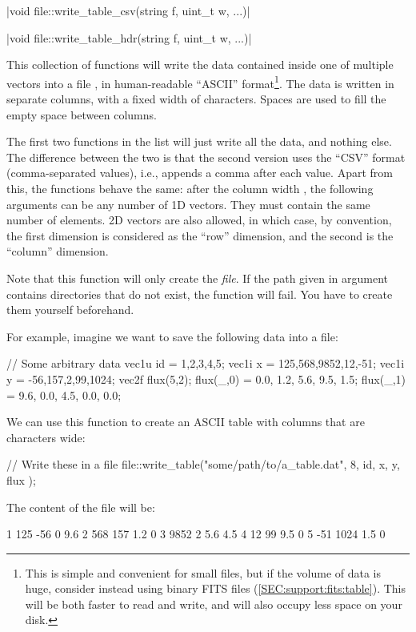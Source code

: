 \documentclass[12pt]{report}
\begin{document}
\begin{itemize}
\cppinline|void file::write_table_csv(string f, uint_t w, ...)| 

\cppinline|void file::write_table_hdr(string f, uint_t w, ...)| 

This collection of functions will write the data contained inside one of multiple vectors into a file , in human-readable ``ASCII'' format\footnote{This is simple and convenient for small files, but if the volume of data is huge, consider instead using binary FITS files (\ref{SEC:support:fits:table}). This will be both faster to read and write, and will also occupy less space on your disk.}. The data is written in separate columns, with a fixed width of  characters. Spaces are used to fill the empty space between columns.

The first two functions in the list will just write all the data, and nothing else. The difference between the two is that the second version uses the ``CSV'' format (comma-separated values), i.e., appends a comma after each value. Apart from this, the functions behave the same: after the column width , the following arguments can be any number of 1D vectors. They must contain the same number of elements. 2D vectors are also allowed, in which case, by convention, the first dimension is considered as the ``row'' dimension, and the second is the ``column'' dimension.

Note that this function will only create the \emph{file}. If the path  given in argument contains directories that do not exist, the function will fail. You have to create them yourself beforehand.

For example, imagine we want to save the following data into a file:
\begin{cppcode}
// Some arbitrary data
vec1u id = {1,2,3,4,5};
vec1i x = {125,568,9852,12,-51};
vec1i y = {-56,157,2,99,1024};
vec2f flux(5,2);
flux(_,0) = {0.0, 1.2, 5.6, 9.5, 1.5};
flux(_,1) = {9.6, 0.0, 4.5, 0.0, 0.0};
\end{cppcode}

We can use this function to create an ASCII table with columns that are  characters wide:
\begin{cppcode}
// Write these in a file
file::write_table("some/path/to/a_table.dat", 8,
    id, x, y, flux
);
\end{cppcode}

The content of the file will be:
\begin{bashcode}
       1     125     -56       0     9.6
       2     568     157     1.2       0
       3    9852       2     5.6     4.5
       4      12      99     9.5       0
       5     -51    1024     1.5       0
\end{bashcode}


\end{itemize}
\end{document}
